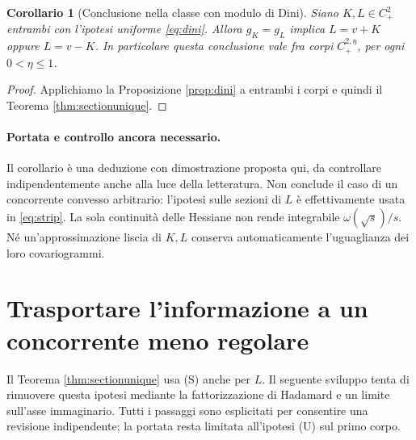 \documentclass[11pt,a4paper]{article}
\newtheorem{corollary}[theorem]{Corollario}
\theoremstyle{remark}
\begin{document}
\begin{corollary}[Conclusione nella classe con modulo di Dini]\label{cor:dini}
Siano $K,L\in C^2_+$ entrambi con l'ipotesi uniforme
\eqref{eq:dini}. Allora $g_K=g_L$ implica $L=v+K$ oppure $L=v-K$.
In particolare questa conclusione vale fra corpi $C^{2,\eta}_+$,
per ogni $0<\eta\leq1$.
\end{corollary}
\begin{proof}
Applichiamo la Proposizione \ref{prop:dini} a entrambi i corpi e quindi
il Teorema \ref{thm:sectionunique}.
\end{proof}

\paragraph{Portata e controllo ancora necessario.}
Il corollario è una deduzione con dimostrazione proposta qui, da
controllare indipendentemente anche alla luce della letteratura.
Non conclude il caso di un concorrente convesso arbitrario: l'ipotesi
sulle sezioni di $L$ è effettivamente usata in \eqref{eq:strip}.
La sola continuità delle Hessiane non rende integrabile
$\omega(\sqrt{s})/s$. Né un'approssimazione liscia di $K,L$ conserva
automaticamente l'uguaglianza dei loro covariogrammi.

\section{Trasportare l'informazione a un concorrente meno regolare}
\label{sec:transport}
Il Teorema \ref{thm:sectionunique} usa (S) anche per $L$. Il seguente
sviluppo tenta di rimuovere questa ipotesi mediante la fattorizzazione
di Hadamard e un limite sull'asse immaginario. Tutti i passaggi sono
esplicitati per consentire una revisione indipendente; la portata resta
limitata all'ipotesi (U) sul primo corpo.
\end{document}
